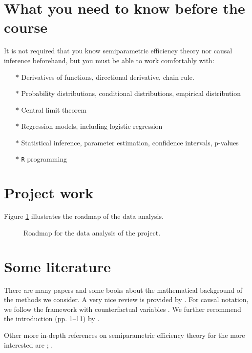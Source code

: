 \documentclass{article}
\newcommand{\1}{\mathbb{1}}
\begin{document}
\section{What you need to know before the course}

It is not required that you know semiparametric efficiency theory nor
causal inference beforehand, but you must be able to work comfortably
with:

\begin{itemize}
\item[\(*\)] Derivatives of functions, directional derivative, chain rule.
\item[\(*\)] Probability distributions, conditional distributions, empirical
  distribution
\item[\(*\)] Central limit theorem
\item[\(*\)] Regression models, including logistic regression
\item[\(*\)] Statistical inference, parameter estimation, confidence
  intervals, p-values
\item[\(*\)] \verb+R+ programming
\end{itemize}

 
\section{Project work}

Figure \ref{fig:roadmap} illustrates the roadmap of the data analysis.

\begin{figure}[!h] %
\begin{center}
\end{center}
\caption{Roadmap for the data analysis of the project.}
\label{fig:roadmap}
\end{figure}

\section{Some literature}

There are many papers and some books about the mathematical background
of the methods we consider. A very nice review is provided by
\cite{kennedy2016semiparametric}. %
For causal notation, we follow the framework with counterfactual
variables \cite{hernanrobins}. %
We further recommend the introduction (pp. 1--11) by
\cite{chernozhukov2018double}.
 
Other more in-depth references on semiparametric efficiency theory for
the more interested are
\cite{bickel1993efficient,van2000asymptotic,vanRobins2003unified,
  tsiatis2007semiparametric}; \citet[][Appendix A]{ van2011targeted}.


\end{document}
